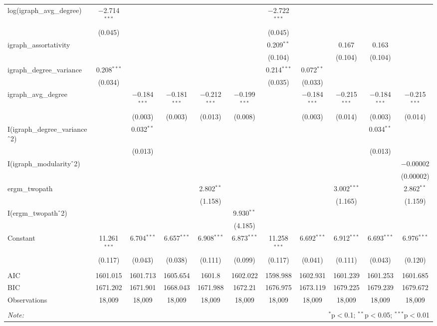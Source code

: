 \begin{table}[!htbp]
\begin{tabular}{@{\extracolsep{5pt}}lcccccccccc}
  log(igraph\_avg\_degree) & $-$2.714$^{***}$ &  &  &  &  & $-$2.722$^{***}$ &  &  &  &  \\ 
  & (0.045) &  &  &  &  & (0.045) &  &  &  &  \\ 
  igraph\_assortativity &  &  &  &  &  & 0.209$^{**}$ &  & 0.167 & 0.163 &  \\ 
  &  &  &  &  &  & (0.104) &  & (0.104) & (0.104) &  \\ 
  igraph\_degree\_variance & 0.208$^{***}$ &  &  &  &  & 0.214$^{***}$ & 0.072$^{**}$ &  &  &  \\ 
  & (0.034) &  &  &  &  & (0.035) & (0.033) &  &  &  \\ 
  igraph\_avg\_degree &  & $-$0.184$^{***}$ & $-$0.181$^{***}$ & $-$0.212$^{***}$ & $-$0.199$^{***}$ &  & $-$0.184$^{***}$ & $-$0.215$^{***}$ & $-$0.184$^{***}$ & $-$0.215$^{***}$ \\ 
  &  & (0.003) & (0.003) & (0.013) & (0.008) &  & (0.003) & (0.014) & (0.003) & (0.014) \\ 
  I(igraph\_degree\_variance$\hat{\mkern6mu}$2) &  & 0.032$^{**}$ &  &  &  &  &  &  & 0.034$^{**}$ &  \\ 
  &  & (0.013) &  &  &  &  &  &  & (0.013) &  \\ 
  I(igraph\_modularity$\hat{\mkern6mu}$2) &  &  &  &  &  &  &  &  &  & $-$0.00002 \\ 
  &  &  &  &  &  &  &  &  &  & (0.00002) \\ 
  ergm\_twopath &  &  &  & 2.802$^{**}$ &  &  &  & 3.002$^{***}$ &  & 2.862$^{**}$ \\ 
  &  &  &  & (1.158) &  &  &  & (1.165) &  & (1.159) \\ 
  I(ergm\_twopath$\hat{\mkern6mu}$2) &  &  &  &  & 9.930$^{**}$ &  &  &  &  &  \\ 
  &  &  &  &  & (4.185) &  &  &  &  &  \\ 
  Constant & 11.261$^{***}$ & 6.704$^{***}$ & 6.657$^{***}$ & 6.908$^{***}$ & 6.873$^{***}$ & 11.258$^{***}$ & 6.692$^{***}$ & 6.912$^{***}$ & 6.693$^{***}$ & 6.976$^{***}$ \\ 
  & (0.117) & (0.043) & (0.038) & (0.111) & (0.099) & (0.117) & (0.041) & (0.111) & (0.043) & (0.120) \\ 
 \hline \\[-1.8ex] 
AIC & 1601.015 & 1601.713 & 1605.654 & 1601.8 & 1602.022 & 1598.988 & 1602.931 & 1601.239 & 1601.253 & 1601.685 \\ 
BIC & 1671.202 & 1671.901 & 1668.043 & 1671.988 & 1672.21 & 1676.975 & 1673.119 & 1679.225 & 1679.239 & 1679.672 \\ 
Observations & 18,009 & 18,009 & 18,009 & 18,009 & 18,009 & 18,009 & 18,009 & 18,009 & 18,009 & 18,009 \\ 
\hline 
\hline \\[-1.8ex] 
\textit{Note:}  & \multicolumn{10}{r}{$^{*}$p$<$0.1; $^{**}$p$<$0.05; $^{***}$p$<$0.01} \\ 
\end{tabular} 
\end{table} 
